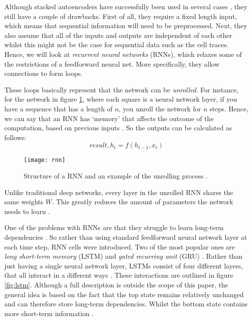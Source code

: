 Although stacked autoencoders have successfully been used in several cases \cite{deeplearningthesis,deeplearning2}, they still have a couple of drawbacks.
First of all, they require a fixed length input, which means that sequential information will need to be preprocessed.
Next, they also assume that all of the inputs and outputs are independent of each other \cite{britz_2016} whilst this might not be the case for sequential data such as the cell traces.
Hence, we will look at \textit{recurrent neural networks} (RNNs), which relaxes some of the restrictions of a feedforward neural net.
More specifically, they allow connections to form loops.

These loops basically represent that the network can be \textit{unrolled}.
For instance, for the network in figure \ref{fig:rnn}, where each square is a neural network layer, if you have a sequence that has a length of $n$, you unroll the network for $n$ steps.
Hence, we can say that an RNN has `memory' that affects the outcome of the computation, based on previous inputs \cite{britz_2016}.
So the outputs can be calculated as follows:
$$\textit{result}, h_t = f(h_{t - 1}, x_t)$$

\begin{figure}[ht]
  \centering
  \texttt{[image: rnn]}
  \caption{Structure of a RNN and an example of the unrolling process \cite{britz_2016}.}
  \label{fig:rnn}
\end{figure}

Unlike traditional deep networks, every layer in the unrolled RNN shares the same weights $W$.
This greatly reduces the amount of parameters the network needs to learn \cite{britz_2016}.

One of the problems with RNNs are that they struggle to learn long-term dependencies \cite{bengio1994learning}.
So rather than using standard feedforward neural network layer at each time step, RNN cells were introduced.
Two of the most popular ones are \textit{long short-term memory} (LSTM) and \textit{gated recurring unit} (GRU) \cite{hochreiter1997long,LSTM,cho2014learning}.
Rather than just having a single neural network layer, LSTMs consist of four different layers, that all interact in a different ways \cite{LSTM}.
These interactions are outlined in figure \ref{fig:lstm}.
Although a full description is outside the scope of this paper, the general idea is based on the fact that the top state remains relatively unchanged and can therefore store long-term dependencies.
Whilst the bottom state contains more short-term information \cite{LSTM,hochreiter1997long}.

